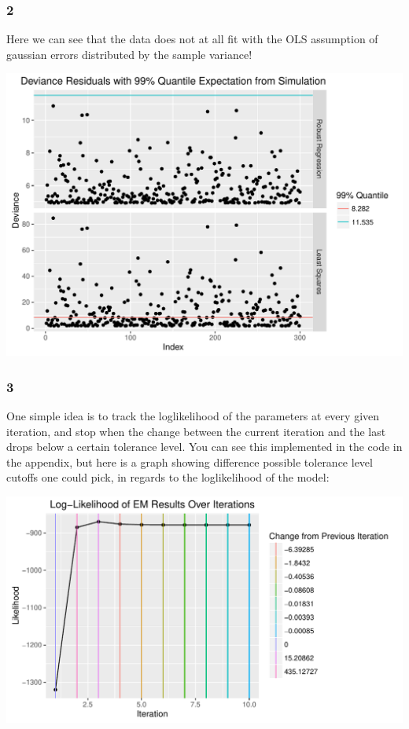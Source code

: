 \documentclass[a4paper,12pt]{article}\usepackage[]{graphicx}\usepackage[]{color}
\makeatletter
\def\maxwidth{ %
  \ifdim\Gin@nat@width>\linewidth
    \linewidth
  \else
    \Gin@nat@width
  \fi
}
\newenvironment{knitrout}{}{} %
\makeatother
\begin{document}
\subsubsection*{2}
%
Here we can see that the data does not at all fit with the OLS assumption of gaussian errors distributed by the sample variance!

\begin{knitrout}
\color{fgcolor}
\includegraphics[width=\maxwidth]{figure/deviance-1} 

\end{knitrout}

\subsubsection*{3}

One simple idea is to track the loglikelihood of the parameters at every given iteration, and stop when the change between the current iteration and the last drops below a certain tolerance level. You can see this implemented in the code in the appendix, but here is a graph showing difference possible tolerance level cutoffs one could pick, in regards to the loglikelihood of the model:

\begin{knitrout}
\color{fgcolor}
\includegraphics[width=\maxwidth]{figure/loglikelihood-1} 

\end{knitrout}
\end{document}
